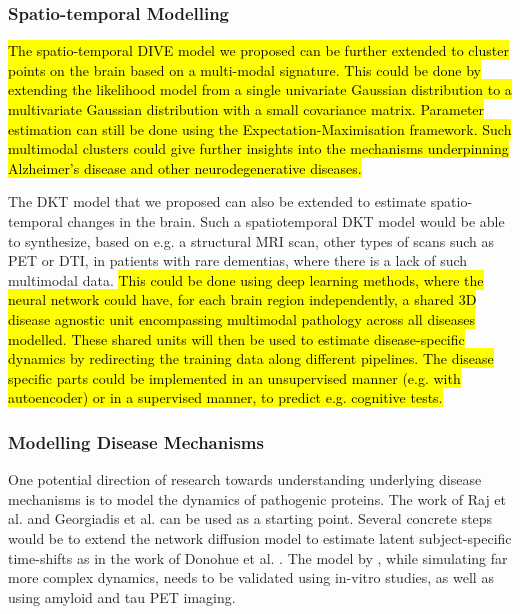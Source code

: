 \subsubsection{Spatio-temporal Modelling}
\label{sec:conMetSpa}

\hl{The spatio-temporal DIVE model we proposed can be further extended to cluster points on the brain based on a multi-modal signature. This could be done by extending the likelihood model from a single univariate Gaussian distribution to a multivariate Gaussian distribution with a small covariance matrix.  Parameter estimation can still be done using the Expectation-Maximisation framework. Such multimodal clusters could give further insights into the mechanisms underpinning Alzheimer's disease and other neurodegenerative diseases.}

The DKT model that we proposed can also be extended to estimate spatio-temporal changes in the brain. Such a spatiotemporal DKT model would be able to synthesize, based on e.g. a structural MRI scan, other types of scans such as PET or DTI, in patients with rare dementias, where there is a lack of such multimodal data. \hl{This could be done using deep learning methods, where the neural network could have, for each brain region independently, a shared 3D disease agnostic unit encompassing multimodal pathology across all diseases modelled. These shared units will then be used to estimate disease-specific dynamics by redirecting the training data along different pipelines. The disease specific parts could be implemented in an unsupervised manner (e.g. with autoencoder) or in a supervised manner, to predict e.g. cognitive tests. }

\subsubsection{Modelling Disease Mechanisms}
\label{sec:conMetMec}

One potential direction of research towards understanding underlying disease mechanisms is to model the dynamics of pathogenic proteins. The work of Raj et al. \cite{raj2012network, raj2015network} and Georgiadis et al. \cite{georgiadis2018computational} can be used as a starting point. Several concrete steps would be to extend the network diffusion model \cite{raj2015network} to estimate latent subject-specific time-shifts as in the work of Donohue et al. \cite{donohue2014estimating}. The model by \cite{georgiadis2018computational}, while simulating far more complex dynamics, needs to be validated using in-vitro studies, as well as using amyloid and tau PET imaging. 

